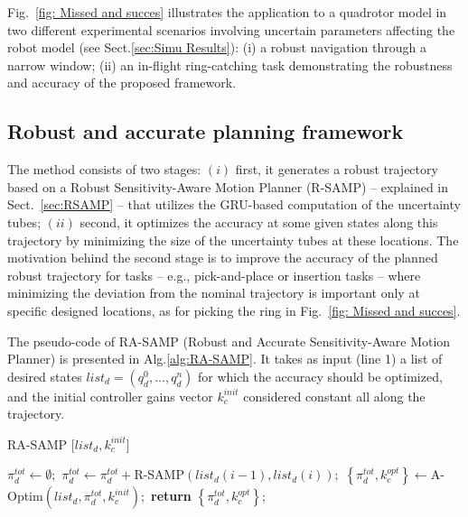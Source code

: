 Fig.~\ref{fig: Missed and succes} illustrates the application to a quadrotor model in two different experimental scenarios involving uncertain parameters affecting the robot model (see Sect.\ref{sec:Simu Results}): (i) a robust navigation through a narrow window;
(ii) an in-flight ring-catching task demonstrating the robustness and accuracy of the proposed framework. 


\subsection{Robust and accurate planning framework}\label{sec:RASAMP}

The method consists of two stages: $(i)$ first, it generates a robust trajectory based on a Robust Sensitivity-Aware Motion Planner (R-SAMP) -- explained in Sect.~\ref{sec:RSAMP} -- that utilizes the GRU-based computation of the uncertainty tubes; $(ii)$ second, it optimizes the accuracy at some given states along this trajectory by minimizing the size of the uncertainty tubes at these locations.
The motivation behind the second stage is to improve the accuracy of the planned robust trajectory for tasks -- e.g., pick-and-place or insertion tasks -- where minimizing the deviation from the nominal trajectory is important only at specific designed locations, as for picking the ring in Fig.~\ref{fig: Missed and succes}.

The pseudo-code of RA-SAMP (Robust and Accurate Sensitivity-Aware Motion Planner) is presented in Alg.\ref{alg:RA-SAMP}. 
It takes as input (line 1) a list of desired states $list_{d} = (q_{d}^0, \dots, q_{d}^n)$ for which the accuracy should be optimized, and the initial controller gains vector $k_{c}^{init}$ considered constant all along the trajectory.

\begin{algorithm}[h]
\caption{RA-SAMP [$list_{d}, k_{c}^{init}$]}\label{alg:RA-SAMP}
\begin{algorithmic}[1]
\State $\pi_d^{tot} \gets \emptyset;$
    \State $\pi_d^{tot} \gets \pi_d^{tot} + $R-SAMP$(list_{d}(i-1),list_{d}(i));$
\EndFor
\State $\left \{ \pi_d^{tot}, k_{c}^{opt} \right \} \gets $A-Optim$(list_{d},\pi_d^{tot}, k_{c}^{init});$
\State \textbf{return} $\left \{ \pi_d^{tot}, k_{c}^{opt}  \right \}$;
\end{algorithmic}
\end{algorithm}

